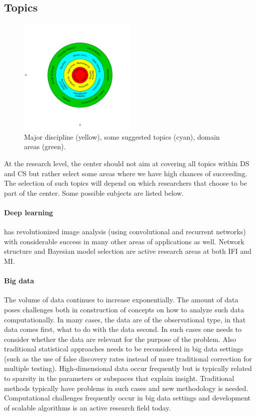 \documentclass[a4paper,10pt]{article}
\begin{document}
\subsection{Topics}


\begin{figure}
\centering
\vspace*{-0.5cm}
\includegraphics[width=0.5\textwidth,trim={3.7cm 2.9cm 1.6cm 2.4cm},clip]{DASCO.pdf}
\caption{\label{fig:dept}Major discipline (yellow), some suggested topics (cyan), domain areas (green).}
\vspace*{-1cm}
\end{figure}

At the research level, the center should not aim at covering all
topics within DS and CS but rather select some areas where we have
high chances of succeeding. The selection of such topics will depend on which
researchers that choose to be part of the center. Some possible
subjects are listed below.



\paragraph{Deep learning} has revolutionized image analysis (using convolutional and recurrent networks) with considerable success in  many other areas of applications as well. Network structure and Bayesian model selection are active research areas at both IFI and MI.


\paragraph{Big data} The volume of data continues to increase exponentially. The amount of data poses challenges both in construction of concepts on how to analyze such data computationally.
In many cases, the data are of the observational type, in that data comes first, what to do with the data second. In such cases one needs to consider whether the data are relevant for the purpose of the problem. Also traditional statistical approaches  needs to be reconsidered in big data settings (such as the use of false discovery rates instead of more traditional correction for multiple testing).
High-dimensional data occur frequently but is typically related to sparsity in the parameters or subspaces that explain insight. Traditional methods typically have problems in such cases and new methodology is needed. Computational challenges frequently occur in big data settings and development of scalable algorithms is an active research field today. 
\end{document}
